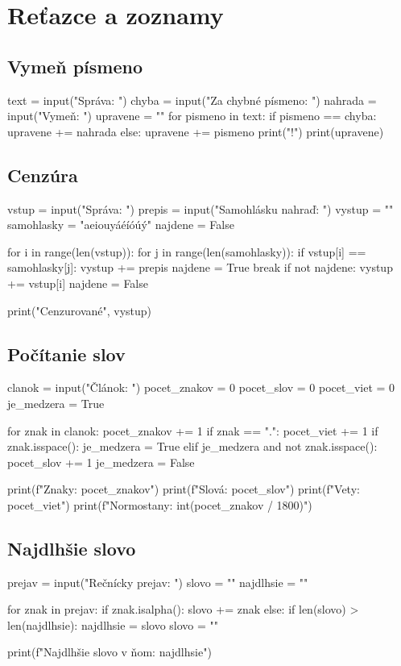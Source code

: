 \section{Reťazce a zoznamy}

\subsection{Vymeň písmeno}
\begin{solution}
text = input("Správa: ")
chyba = input("Za chybné písmeno: ")
nahrada = input("Vymeň: ")
upravene = ""
for pismeno in text:
    if pismeno == chyba:
        upravene += nahrada
    else:
        upravene += pismeno
print("!")
print(upravene)
\end{solution}


\subsection{Cenzúra}
\begin{solution}
vstup = input("Správa: ")
prepis = input("Samohlásku nahraď: ")
vystup = ""
samohlasky = "aeiouyáéíóúý"
najdene = False

for i in range(len(vstup)):
    for j in range(len(samohlasky)):
        if vstup[i] == samohlasky[j]:
            vystup += prepis
            najdene = True
            break
    if not najdene:
        vystup += vstup[i]
    najdene = False
 
print("Cenzurované", vystup)
\end{solution}

\subsection{Počítanie slov}
\begin{solution}
clanok = input("Článok: ")
pocet_znakov = 0
pocet_slov = 0
pocet_viet = 0
je_medzera = True

for znak in clanok:
    pocet_znakov += 1
    if znak == ".":
        pocet_viet += 1
    if znak.isspace():
        je_medzera = True
    elif je_medzera and not znak.isspace():
        pocet_slov += 1
        je_medzera = False

print(f"Znaky: {pocet_znakov}")
print(f"Slová: {pocet_slov}")
print(f"Vety: {pocet_viet}")
print(f"Normostany: {int(pocet_znakov / 1800)}")
\end{solution}


\subsection{Najdlhšie slovo}
\begin{solution}
prejav = input("Rečnícky prejav: ")
slovo = ""
najdlhsie = ""

for znak in prejav:
    if znak.isalpha():
        slovo += znak
    else:
        if len(slovo) > len(najdlhsie):
            najdlhsie = slovo
        slovo = ""

print(f"Najdlhšie slovo v ňom: {najdlhsie}")
\end{solution}

